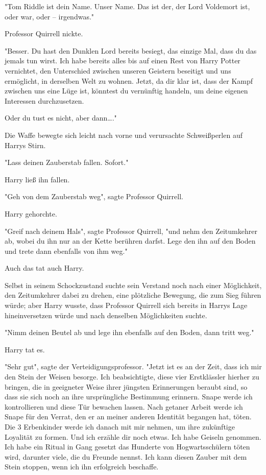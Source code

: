 {"Tom Riddle ist dein Name. Unser Name. Das ist der, der Lord Voldemort ist, oder war, oder -- irgendwas."

Professor Quirrell nickte.

"Besser. Du hast den Dunklen Lord bereits besiegt, das einzige Mal, dass du das jemals tun wirst. Ich habe bereits alles bis auf einen Rest von Harry Potter vernichtet, den Unterschied zwischen unseren Geistern beseitigt und uns ermöglicht, in derselben Welt zu wohnen. Jetzt, da dir klar ist, dass der Kampf zwischen uns eine Lüge ist, könntest du vernünftig handeln, um deine eigenen Interessen durchzusetzen.

Oder du tust es nicht, aber dann…."

Die Waffe bewegte sich leicht nach vorne und verursachte Schweißperlen auf Harrys Stirn.

"Lass deinen Zauberstab fallen. Sofort."

Harry ließ ihn fallen.

"Geh von dem Zauberstab weg", sagte Professor Quirrell.

Harry gehorchte.

"Greif nach deinem Hals", sagte Professor Quirrell, "und nehm den Zeitumkehrer ab, wobei du ihn nur an der Kette berühren darfst. Lege den ihn auf den Boden und trete dann ebenfalls von ihm weg."

Auch das tat auch Harry.

Selbst in seinem Schockzustand suchte sein Verstand noch nach einer Möglichkeit, den Zeitumkehrer dabei zu drehen, eine plötzliche Bewegung, die zum Sieg führen würde; aber Harry wusste, dass Professor Quirrell sich bereits in Harrys Lage hineinversetzen würde und nach denselben Möglichkeiten suchte.

"Nimm deinen Beutel ab und lege ihn ebenfalls auf den Boden, dann tritt weg."

Harry tat es.

"Sehr gut", sagte der Verteidigungsprofessor. "Jetzt ist es an der Zeit, dass ich mir den Stein der Weisen besorge. Ich beabsichtigte, diese vier Erstklässler hierher zu bringen, die in geeigneter Weise ihrer jüngsten Erinnerungen beraubt sind, so dass sie sich noch an ihre ursprüngliche Bestimmung erinnern. Snape werde ich kontrollieren und diese Tür bewachen lassen. Nach getaner Arbeit werde ich Snape für den Verrat, den er an meiner anderen Identität begangen hat, töten. Die 3 Erbenkinder werde ich danach mit mir nehmen, um ihre zukünftige Loyalität zu formen. Und ich erzähle dir noch etwas. Ich habe Geiseln genommen. Ich habe ein Ritual in Gang gesetzt das Hunderte von Hogwartsschülern töten wird, darunter viele, die du Freunde nennst. Ich kann diesen Zauber mit dem Stein stoppen, wenn ich ihn erfolgreich beschaffe.

}

